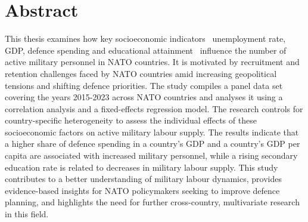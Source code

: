 \chapter*{Abstract}

This thesis examines how key socioeconomic indicators \textemdash\ unemployment rate, GDP, defence spending and educational attainment \textemdash\ influence the number of active military personnel in NATO countries.
It is motivated by recruitment and retention challenges faced by NATO countries amid increasing geopolitical tensions and shifting defence priorities.
The study compiles a panel data set covering the years 2015-2023 across NATO countries and analyses it using a correlation analysis and a fixed-effects regression model. 
The research controls for country-specific heterogeneity to assess the individual effects of these socioeconomic factors on active military labour supply.
The results indicate that a higher share of defence spending in a country's GDP and a country's GDP per capita are associated with increased military personnel, while a rising secondary education rate is related to decreases in military labour supply. 
This study contributes to a better understanding of military labour dynamics, provides evidence-based insights for NATO policymakers seeking to improve defence planning, and highlights the need for further cross-country, multivariate research in this field.